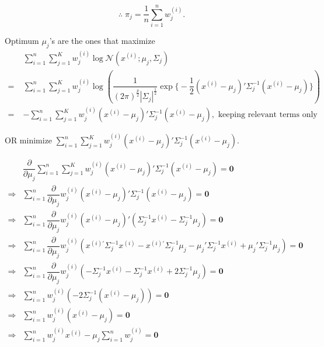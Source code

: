 \documentclass[11pt, a4paper]{article}
\begin{document}
$$\boxed{\therefore\; \pi_j = \dfrac{1}{n} \sum \limits_{i=1}^{n}w_j^{(i)}.}$$

Optimum $\mu_j$'s are the ones that maximize 
\begin{align*}
&\sum \limits_{i = 1}^{n} \sum \limits_{j = 1}^{K} w_j^{(i)} \log \mathcal{N}(x^{(i)}; \mu_j, \Sigma_j) \\[0.5em]
= \; &\sum \limits_{i = 1}^{n} \sum \limits_{j = 1}^{K} w_j^{(i)} \log \left( \dfrac{1}{(2\pi)^{\frac{p}{2}} |\Sigma_j|^{\frac{1}{2}} }
\exp\Bigg\{-\dfrac{1}{2} \left(x^{(i)}-\mu_j\right)'\Sigma_j^{-1}\left(x^{(i)}-\mu_j\right)\Bigg\} \right) \\[0.5em]
= \; &-\sum \limits_{i = 1}^{n} \sum \limits_{j = 1}^{K} w_j^{(i)} \left(x^{(i)}-\mu_j\right)'\Sigma_j^{-1}\left(x^{(i)}-\mu_j\right), \text{ keeping relevant terms only}
\end{align*}

OR minimize $\sum \limits_{i = 1}^{n} \sum \limits_{j = 1}^{K} w_j^{(i)} \left(x^{(i)}-\mu_j\right)'\Sigma_j^{-1}\left(x^{(i)}-\mu_j\right)$.


\begin{align*}
&\dfrac{\partial}{\partial \mu_j} \sum \limits_{i = 1}^{n} \sum \limits_{j = 1}^{K} w_j^{(i)} \left(x^{(i)}-\mu_j\right)'\Sigma_j^{-1}\left(x^{(i)}-\mu_j\right) = \boldsymbol{0} \\[0.5em]
\Rightarrow & \sum \limits_{i = 1}^{n} \dfrac{\partial}{\partial \mu_j} w_j^{(i)} \left(x^{(i)}-\mu_j\right)'\Sigma_j^{-1}\left(x^{(i)}-\mu_j\right) = \boldsymbol{0} \\[0.5em]
\Rightarrow & \sum \limits_{i = 1}^{n} \dfrac{\partial}{\partial \mu_j} w_j^{(i)} \left( x^{(i)}-\mu_j\right )' \left(\Sigma_j^{-1}x^{(i)}-\Sigma_j^{-1}\mu_j\right) = \boldsymbol{0} \\[0.5em]
\Rightarrow & \sum \limits_{i = 1}^{n} \dfrac{\partial}{\partial \mu_j}
w_j^{(i)} \left( x^{(i)'} \Sigma_j^{-1} x^{(i)} - x^{(i)'}\Sigma_j^{-1}\mu_j - \mu_j'\Sigma_j^{-1}x^{(i)} + \mu_j' \Sigma_j^{-1}\mu_j \right) = \boldsymbol{0} \\[0.5em]
\Rightarrow & \sum \limits_{i = 1}^{n} \dfrac{\partial}{\partial \mu_j}
w_j^{(i)} \left( -\Sigma_j^{-1}x^{(i)} - \Sigma_j^{-1}x^{(i)} + 2\Sigma_j^{-1}\mu_j \right) = \boldsymbol{0} \\[0.5em]
\Rightarrow & \sum \limits_{i = 1}^{n} w_j^{(i)} \left( -2\Sigma_j^{-1}
\left( x^{(i)}-\mu_j \right) \right) = \boldsymbol{0} \\[0.5em]
\Rightarrow & \sum \limits_{i = 1}^{n} w_j^{(i)} \left( x^{(i)}-\mu_j \right) = \boldsymbol{0} \\[0.5em]
\Rightarrow & \sum \limits_{i = 1}^{n} w_j^{(i)} x^{(i)} - \mu_j \sum \limits_{i = 1}^{n} w_j^{(i)} = \boldsymbol{0}
\end{align*}
\end{document}
